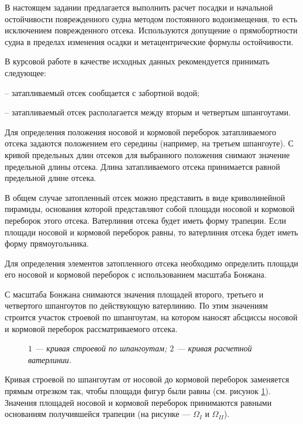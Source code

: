 В настоящем задании предлагается выполнить расчет посадки и начальной остойчивости поврежденного судна методом постоянного водоизмещения, то есть исключением поврежденного отсека.
Используются допущение о прямобортности судна в пределах изменения осадки и метацентрические формулы остойчивости.

В курсовой работе в качестве исходных данных рекомендуется принимать следующее:

-- затапливаемый отсек сообщается с забортной водой;

-- затапливаемый отсек располагается между вторым и четвертым шпангоутами.

Для определения положения носовой и кормовой переборок затапливаемого отсека задаются положением его середины (например, на третьем шпангоуте).
С кривой предельных длин отсеков для выбранного положения снимают значение предельной длины отсека.
Длина затапливаемого отсека принимается равной предельной длине отсека.

В общем случае затопленный отсек можно представить в виде криволинейной пирамиды, основания которой представляют собой площади носовой и кормовой переборок этого отсека.
Ватерлиния отсека будет иметь форму трапеции.
Если площади носовой и кормовой переборок равны, то ватерлиния отсека будет иметь форму прямоугольника.

Для определения элементов затопленного отсека необходимо определить площади его носовой и кормовой переборок с использованием масштаба Бонжана.

С масштаба Бонжана снимаются значения площадей второго, третьего и четвертого шпангоутов по действующую ватерлинию.
По этим значениям строится участок строевой по шпангоутам, на котором наносят абсциссы носовой и кормовой переборок рассматриваемого отсека.

\begin{figure}[h!]
    \centerline{}
    \caption{Определение элементов затопленного отсека}
    \caption*{\textit{
        $1$ --- кривая строевой по шпангоутам;
        $2$ --- кривая расчетной ватерлинии.
    }}
    \label{fig:comp-elements}
\end{figure}

Кривая строевой по шпангоутам от носовой до кормовой переборок заменяется прямым отрезком так, чтобы площади фигур были равны (см. рисунок \ref{fig:comp-elements}).
Значения площадей носовой и кормовой переборок принимаются равными основаниям получившейся трапеции (на рисунке --- $\Omega_{I}$ и $\Omega_{II}$).

